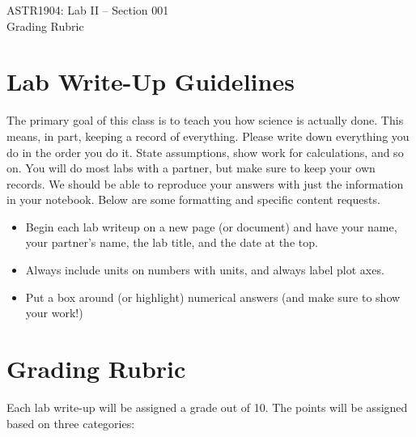 \documentclass[10pt]{article}
\begin{document}
\begin{center}
\LARGE{ASTR1904: Lab II -- Section 001} \\ \medskip \Large{Grading Rubric}\\ 
\end{center}

\section*{Lab Write-Up Guidelines}

The primary goal of this class is to teach you how science is actually done. This means, in part, keeping a record of everything. Please write down everything you do in the order you do it. State assumptions, show work for calculations, and so on. You will do most labs with a partner, but make sure to keep your own records. We should be able to reproduce your answers with just the information in your notebook. Below are some formatting and specific content requests.

\begin{itemize}
\item Begin each lab writeup on a new page (or document) and have your name, your partner's name, the lab title, and the date at the top.
\item Always include units on numbers with units, and always label plot axes.
\item Put a box around (or highlight) numerical answers (and make sure to show your work!)
\end{itemize}

\section*{Grading Rubric}

Each lab write-up will be assigned a grade out of 10. The points will be assigned based on three categories:
\end{document}
